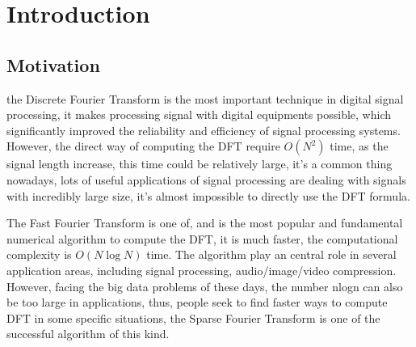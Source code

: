 \documentclass[journal,transmag]{IEEEtran}
\begin{document}
%
\IEEEpeerreviewmaketitle

\theoremstyle{plain}
\newtheorem{thm}{Theorem}[section] %

\theoremstyle{definition}
\newtheorem{defn}[thm]{Definition} %
\newtheorem{exmp}[thm]{Example}

\section{Introduction}
% 
% 
% 
% 


\subsection{Motivation}

the Discrete Fourier Transform is the most important technique in digital signal processing, it makes processing signal with digital equipments possible, which significantly improved the reliability and efficiency of signal processing systems. However, the direct way of computing the DFT require $O(N^2)$ time, as the signal length increase, this time could be relatively large, it’s a common thing nowadays, lots of useful applications of signal processing are dealing with signals with incredibly large size, it’s almost impossible to directly use the DFT formula. 

The Fast Fourier Transform is one of, and is the most popular and fundamental numerical algorithm to compute the DFT, it is much faster, the computational complexity is $O(N\log N)$ time. The algorithm play an central role in several application areas, including signal processing, audio/image/video compression. However, facing the big data problems of these days, the number nlogn can also be too large in applications, thus, people seek to find faster ways to compute DFT in some specific situations, the Sparse Fourier Transform is one of the successful algorithm of this kind.
\end{document}
